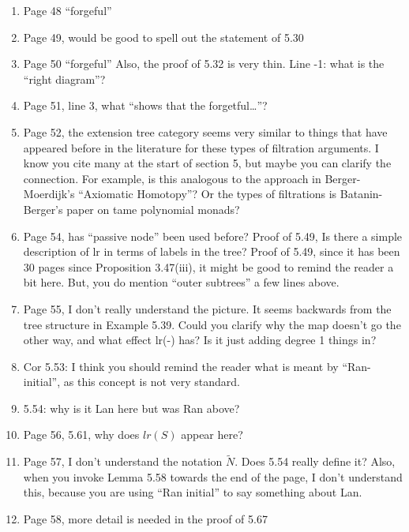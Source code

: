 \documentclass{article}
\begin{document}
\begin{enumerate}
\item
Page 48 ``forgeful''

\item
Page 49, would be good to spell out the statement of 5.30

\item
Page 50 ``forgeful''
Also, the proof of 5.32 is very thin.
Line -1: what is the ``right diagram''?

\item
Page 51, line 3, what ``shows that the forgetful\dots''?

\item
Page 52, the extension tree category seems very similar to things that have appeared before in the literature for these types of filtration arguments. I know you cite many at the start of section 5, but maybe you can clarify the connection. For example, is this analogous to the approach in Berger-Moerdijk's ``Axiomatic Homotopy''? Or the types of filtrations is Batanin-Berger's paper on tame polynomial monads?

\item
Page 54, has ``passive node'' been used before?
Proof of 5.49, Is there a simple description of lr in terms of labels in the tree?
Proof of 5.49, since it has been 30 pages since Proposition 3.47(iii), it might be good to remind the reader a bit here. But, you do mention ``outer subtrees'' a few lines above.

\item
Page 55, I don't really understand the picture. It seems backwards from the tree structure in Example 5.39. Could you clarify why the map doesn't go the other way, and what effect lr(-) has? Is it just adding degree 1 things in?

\item
Cor 5.53: I think you should remind the reader what is meant by ``Ran-initial'', as this concept is not very standard.

\item
5.54: why is it Lan here but was Ran above?

\item
Page 56, 5.61, why does $lr(S)$ appear here?

\item
Page 57, I don't understand the notation $\tilde{N}$. Does 5.54 really define it?
Also, when you invoke Lemma 5.58 towards the end of the page, I don't understand this, because you are using ``Ran initial'' to say something about Lan.

\item
Page 58, more detail is needed in the proof of 5.67


\end{enumerate}
\end{document}
